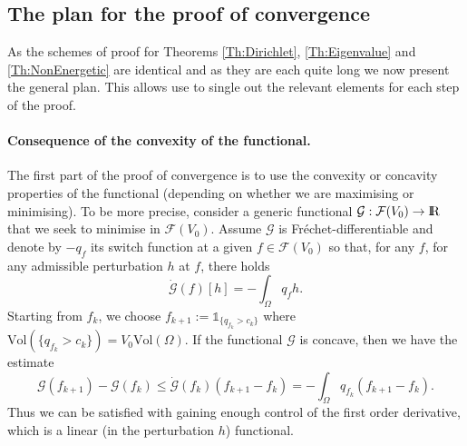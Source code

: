 \documentclass{article}
\newcommand{\R}{\textnormal{I\kern-0.21emR}}
\newcommand{\N}{\textnormal{I\kern-0.21emN}}
\renewcommand{\leq}{\leqslant}
\def\e{{\varepsilon}}
\newtheorem{proposition}[material]{Proposition}
\def\O{{\Omega}}
\numberwithin{equation}{section}
\begin{document}
%
%
%
%
\subsection{The plan for the proof of convergence}\label{Se:IntroPlan}
As the schemes of proof for Theorems \ref{Th:Dirichlet}, \ref{Th:Eigenvalue} and \ref{Th:NonEnergetic} are identical and as they are each quite long we now present the general plan. This allows use to single out the relevant elements for each step of the proof. 

\paragraph{Consequence of the convexity of the functional.}
The first part of the proof of convergence is to use the convexity or concavity properties of the functional (depending on whether we are maximising or minimising). To be more precise, consider a generic functional $\mathcal G:\mathcal F(V_0)\to \R$ that we seek to minimise in $\mathcal F(V_0)$. Assume $\mathcal G$ is Fr\'echet-differentiable and denote by $-q_f$ its switch function at a given $f\in \mathcal F(V_0)$ so that, for any $f$, for any admissible perturbation $h$ at $f$, there holds 
\[ \dot{\mathcal G}(f)[h]=-\int_\O q_f h.\]  Starting from $f_k$, we choose $f_{k+1}:=\mathds1_{\{q_{f_k}>c_k\}}$ where $\mathrm{Vol}\left(\{q_{f_k}>c_k\}\right)=V_0\mathrm{Vol}(\O)$. If the functional $\mathcal G$ is concave, then we have the estimate
\begin{equation}\label{Eq:ConsequenceConvexity} \mathcal G(f_{k+1})-\mathcal G(f_k)\leq \dot{\mathcal G}(f_k)(f_{k+1}-f_k)=-\int_\O q_{f_k}\left(f_{k+1}-f_k\right).\end{equation} Thus we can be satisfied with gaining enough control of the first order derivative, which is a linear (in the perturbation $h$) functional.
\end{document}
